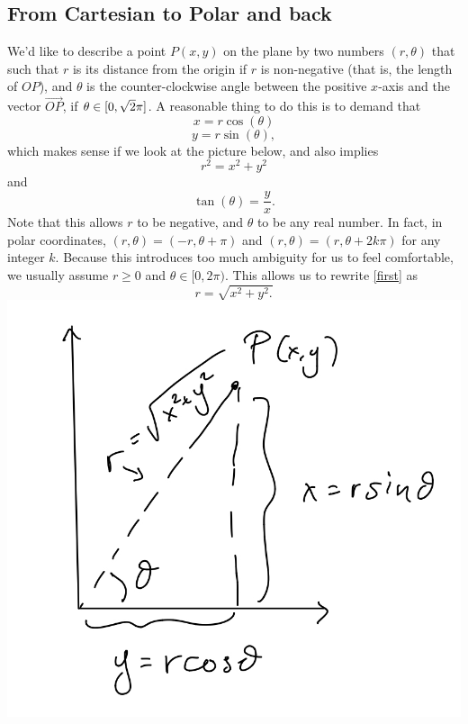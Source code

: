 \documentclass[12pt]{article}
\begin{document}
\subsection*{From Cartesian to Polar and back}
We'd like to describe a point $P(x,y)$ on the plane by two numbers $(r,\theta)$ that such that $r$ is its distance from the origin if $r$ is non-negative (that is, the length of $OP$), and $\theta$ is the counter-clockwise angle between the positive $x$-axis and the vector $\vec{OP}$, if $\theta\in [0,\sqrt{2}\pi]$. A reasonable thing to do this is to demand that \begin{equation}
x=r\cos(\theta)
\end{equation}\begin{equation}
y=r\sin(\theta),
\end{equation}
which makes sense if we look at the picture below, and also implies \begin{equation}\label{first}r^2=x^2+y^2\end{equation} and \begin{equation}
\tan(\theta)=\frac{y}{x}.
\end{equation} Note that this allows $r$ to be negative, and $\theta$ to be any real number. In fact, in polar coordinates, $(r,\theta)=(-r,\theta+\pi)$ and $(r,\theta)=(r,\theta + 2k\pi) $ for any integer $k$. Because this introduces too much ambiguity for us to feel comfortable, we usually assume $r\geq 0$ and $\theta\in [0,2\pi)$. This allows us to rewrite \eqref{first} as \begin{equation}
r=\sqrt{x^2+y^2.}
\end{equation}
\includegraphics[scale=.2]{polar.jpeg}
\end{document}

